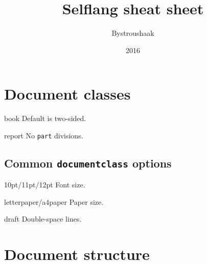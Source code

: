 \documentclass[10pt]{article}
\title{Selflang sheat sheet}
\author{Bystroushaak}
\date{2016}
\renewcommand{\maketitle}{%
{\begin{center}\Large \mythetitle\end{center}}
}
\begin{document}
\begin{multicols}{3}
\maketitle

\section{Document classes}

\begin{ttdesc}[labelwidth=\widthof{\texttt{report}}]
\item[book] Default is two-sided.
\item[report] No \texttt{part} divisions.
\end{ttdesc}

\subsection{Common \texttt{documentclass} options}

\begin{ttdesc}[labelwidth=\widthof{\ttfamily{letterpaper/a4paper}}]
\item[10pt/11pt/12pt] Font size.
\item[letterpaper/a4paper] Paper size.
\item[draft] Double-space lines.
\end{ttdesc}

\section{Document structure}

\vspace{-\baselineskip}


\end{multicols}
\end{document}
